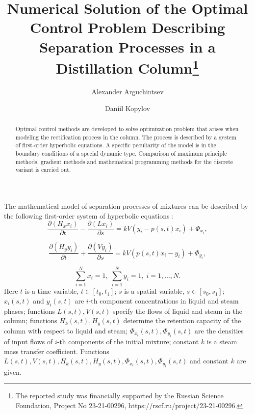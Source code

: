 \documentclass[12pt]{llncs}
\begin{document}
\title{Numerical Solution of the Optimal Control Problem Describing Separation Processes in a Distillation Column\thanks{The reported study was financially supported by the Russian Science Foundation, Project No 23-21-00296, https://rscf.ru/project/23-21-00296.}}


\author{Alexander Arguchintsev   \and   Daniil Kopylov
}


\maketitle
\fi

\begin{abstract}
Optimal control methods are developed to solve optimization problem that arises when modeling the rectification process in the column. The process is described by a system of first-order hyperbolic equations. A specific peculiarity of the model is in the boundary conditions of a special dynamic type. Comparison of maximum principle methods, gradient methods and mathematical programming methods for the discrete variant is carried out.

\end{abstract}


The mathematical model of separation processes of mixtures can be described by the following first-order system of hyperbolic equations \cite{Dem}:
\begin{equation*}
    \frac{\partial (H_x x_i)}{\partial t} -
    \frac{\partial (L x_i)}{\partial s} =
    kV (y_i - p(s,t)x_i) + \Phi_{x_i},
\end{equation*}

\begin{equation*}
    \frac{\partial (H_y y_i)}{\partial t} +
    \frac{\partial (V y_i)}{\partial s} =
    kV (p(s,t)x_i - y_i) + \Phi_{y_i},
\end{equation*}

\begin{equation*}
    \sum_{i=1}^N x_i =1, \; \sum_{i=1}^N y_i = 1, \; i=1, \dots, N.
\end{equation*}
Here $t$ is a time variable, $t \in [t_0, t_1]$; $s$ is a spatial variable, $s \in [s_0, s_1]$; $x_i(s,t)$ and $y_i(s,t)$ are
$i$-th component concentrations in liquid and steam phases; functions $L(s,t), V(s,t)$  specify the flows of liquid and steam in the column; functions $H_k(s,t), H_y(s,t)$ determine the retention capacity of the column with respect to liquid and steam;
$\Phi_{x_i}(s,t), \Phi_{y_i}(s,t)$ are the densities of input flows of $i$-th components of the initial mixture; constant $k$ is a steam mass transfer coefficient. Functions $L(s,t), V(s,t), H_k(s,t), H_y(s,t), \Phi_{x_i}(s,t), \Phi_{y_i}(s,t)$ and constant $k$ are given.
\end{document}
